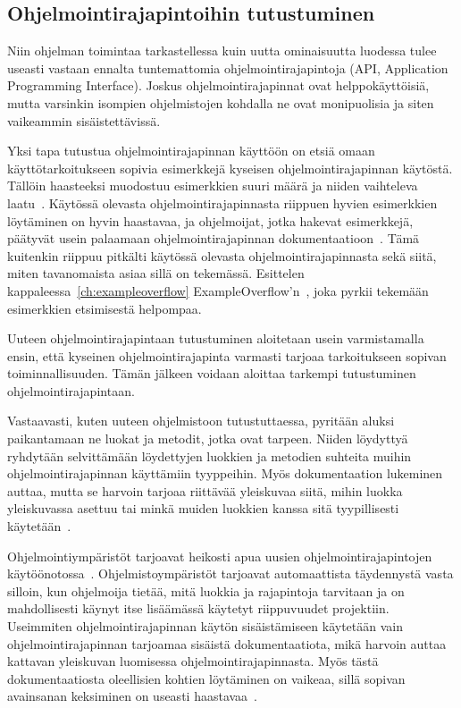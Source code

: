 \documentclass[finnish]{tktltiki2}
\theoremstyle{definition}
\theoremstyle{remark}
\begin{document}
\subsection{Ohjelmointirajapintoihin tutustuminen}
Niin ohjelman toimintaa tarkastellessa kuin uutta ominaisuutta luodessa tulee useasti vastaan ennalta tuntemattomia ohjelmointirajapintoja (API, Application Programming Interface).
Joskus ohjelmointirajapinnat ovat helppokäyttöisiä, mutta varsinkin isompien ohjelmistojen kohdalla ne ovat monipuolisia ja siten vaikeammin sisäistettävissä.

Yksi tapa tutustua ohjelmointirajapinnan käyttöön on etsiä omaan käyttötarkoitukseen sopivia esimerkkejä kyseisen ohjelmointirajapinnan käytöstä. Tällöin haasteeksi muodostuu esimerkkien suuri määrä ja niiden vaihteleva laatu~\cite{example-overflow-social-media-for-code-recommendations}. Käytössä olevasta ohjelmointirajapinnasta riippuen hyvien esimerkkien löytäminen on hyvin haastavaa, ja ohjelmoijat, jotka hakevat esimerkkejä, päätyvät usein palaamaan ohjelmointirajapinnan dokumentaatioon~\cite{asking-and-answering-api-questions}. Tämä kuitenkin riippuu pitkälti käytössä olevasta ohjelmointirajapinnasta sekä siitä, miten tavanomaista asiaa sillä on tekemässä. Esittelen kappaleessa~\ref{ch:exampleoverflow} ExampleOverflow'n~\cite{example-overflow-social-media-for-code-recommendations}, joka pyrkii tekemään esimerkkien etsimisestä helpompaa.

Uuteen ohjelmointirajapintaan tutustuminen aloitetaan usein varmistamalla ensin, että kyseinen ohjelmointirajapinta varmasti tarjoaa tarkoitukseen sopivan toiminnallisuuden. Tämän jälkeen voidaan aloittaa tarkempi tutustuminen ohjelmointirajapintaan.

Vastaavasti, kuten uuteen ohjelmistoon tutustuttaessa, pyritään aluksi paikantamaan ne luokat ja metodit, jotka ovat tarpeen. Niiden löydyttyä ryhdytään selvittämään löydettyjen luokkien ja metodien suhteita muihin ohjelmointirajapinnan käyttämiin tyyppeihin. Myös dokumentaation lukeminen auttaa, mutta se harvoin tarjoaa riittävää yleiskuvaa siitä, mihin luokka yleiskuvassa asettuu tai minkä muiden luokkien kanssa sitä tyypillisesti käytetään~\cite{asking-and-answering-api-questions}.

Ohjelmointiympäristöt tarjoavat heikosti apua uusien ohjelmointirajapintojen käytöönotossa~\cite{jungloid-mining}. Ohjelmistoympäristöt tarjoavat automaattista täydennystä vasta silloin, kun ohjelmoija tietää, mitä luokkia ja rajapintoja tarvitaan ja on mahdollisesti käynyt itse lisäämässä käytetyt riippuvuudet projektiin. Useimmiten ohjelmointirajapinnan käytön sisäistämiseen käytetään vain ohjelmointirajapinnan tarjoamaa sisäistä dokumentaatiota, mikä harvoin auttaa kattavan yleiskuvan luomisessa ohjelmointirajapinnasta. Myös tästä dokumentaatiosta oleellisien kohtien löytäminen on vaikeaa, sillä sopivan avainsanan keksiminen on useasti haastavaa~\cite{what-to-search-for}.
\end{document}
